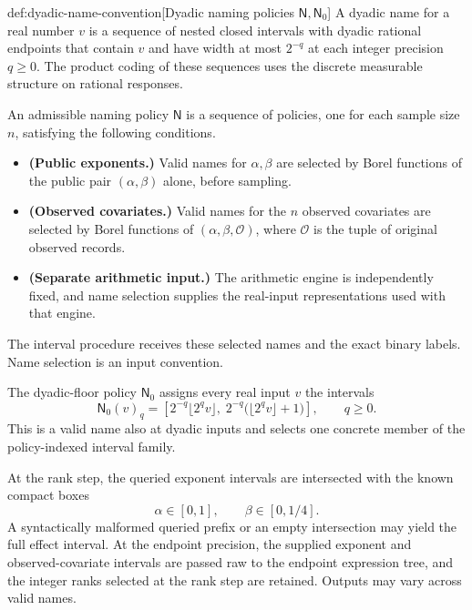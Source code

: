 \begin{definitionv}{def:dyadic-name-convention}[Dyadic naming policies \(\mathsf N,\mathsf N_0\)]
A dyadic name for a real number \(v\) is a sequence of nested closed intervals with dyadic rational endpoints that contain \(v\) and have width at most \(2^{-q}\) at each integer precision \(q\ge0\). The product coding of these sequences uses the discrete measurable structure on rational responses.

An admissible naming policy \(\mathsf N\) is a sequence of policies, one for each sample size \(n\), satisfying the following conditions.
\begin{itemize}
\item \textbf{(Public exponents.)} Valid names for \(\alpha,\beta\) are selected by Borel functions of the public pair \((\alpha,\beta)\) alone, before sampling.
\item \textbf{(Observed covariates.)} Valid names for the \(n\) observed covariates are selected by Borel functions of \((\alpha,\beta,\mathcal O)\), where \(\mathcal O\) is the tuple of original observed records.
\item \textbf{(Separate arithmetic input.)} The arithmetic engine is independently fixed, and name selection supplies the real-input representations used with that engine.
\end{itemize}
The interval procedure receives these selected names and the exact binary labels. Name selection is an input convention.

The dyadic-floor policy \(\mathsf N_0\) assigns every real input \(v\) the intervals
\[
\mathsf N_0(v)_q
=
\left[
2^{-q}\lfloor2^qv\rfloor,\;
2^{-q}\bigl(\lfloor2^qv\rfloor+1\bigr)
\right],
\qquad q\ge0.
\]
This is a valid name also at dyadic inputs and selects one concrete member of the policy-indexed interval family.

At the rank step, the queried exponent intervals are intersected with the known compact boxes
\[
\alpha\in[0,1],\qquad \beta\in[0,1/4].
\]
A syntactically malformed queried prefix or an empty intersection may yield the full effect interval. At the endpoint precision, the supplied exponent and observed-covariate intervals are passed raw to the endpoint expression tree, and the integer ranks selected at the rank step are retained. Outputs may vary across valid names.
\end{definitionv}

